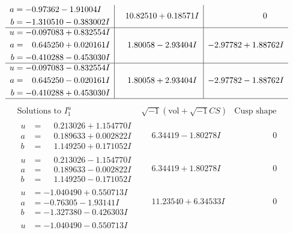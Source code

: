 \documentclass[1p]{elsarticle_modified}
\theoremstyle{definition}
\newcommand{\I}{\sqrt{-1}}
\begin{document}
$$\begin{array}{c|c|c}
\begin{aligned}
a &= -0.97362 - 1.91004 I \\
b &= -1.310510 - 0.383002 I\end{aligned}
 & \phantom{-}10.82510 + 0.18571 I & \phantom{-0.000000 } 0 \\ \hline\begin{aligned}
u &= -0.097083 + 0.832554 I \\
a &= \phantom{-}0.645250 + 0.020161 I \\
b &= -0.410288 - 0.453030 I\end{aligned}
 & \phantom{-}1.80058 - 2.93404 I & -2.97782 + 1.88762 I \\ \hline\begin{aligned}
u &= -0.097083 - 0.832554 I \\
a &= \phantom{-}0.645250 - 0.020161 I \\
b &= -0.410288 + 0.453030 I\end{aligned}
 & \phantom{-}1.80058 + 2.93404 I & -2.97782 - 1.88762 I\\
 \hline 
 \end{array}$$\newpage$$\begin{array}{c|c|c}  
\text{Solutions to }I^u_{1}& \I (\text{vol} + \sqrt{-1}CS) & \text{Cusp shape}\\
 \hline 
\begin{aligned}
u &= \phantom{-}0.213026 + 1.154770 I \\
a &= \phantom{-}0.189633 + 0.002822 I \\
b &= \phantom{-}1.149250 + 0.171052 I\end{aligned}
 & \phantom{-}6.34419 - 1.80278 I & \phantom{-0.000000 } 0 \\ \hline\begin{aligned}
u &= \phantom{-}0.213026 - 1.154770 I \\
a &= \phantom{-}0.189633 - 0.002822 I \\
b &= \phantom{-}1.149250 - 0.171052 I\end{aligned}
 & \phantom{-}6.34419 + 1.80278 I & \phantom{-0.000000 } 0 \\ \hline\begin{aligned}
u &= -1.040490 + 0.550713 I \\
a &= -0.76305 - 1.93141 I \\
b &= -1.327380 - 0.426303 I\end{aligned}
 & \phantom{-}11.23540 + 6.34533 I & \phantom{-0.000000 } 0 \\ \hline\begin{aligned}
u &= -1.040490 - 0.550713 I \\

\end{aligned}
\end{array}$$
\end{document}
